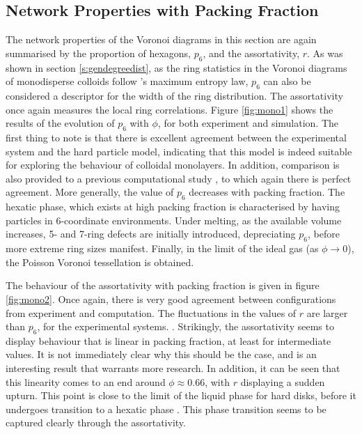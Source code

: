 \subsection{Network Properties with Packing Fraction}

The network properties of the Voronoi diagrams in this section are again summarised by the proportion of hexagons, $p_6$, and the assortativity, $r$.
As was shown in section \ref{s:gendegreedist}, as the ring statistics in the Voronoi diagrams of monodisperse \qtd{} colloids follow \lm's maximum entropy law, $p_6$ can also be considered a descriptor for the width of the ring distribution.
The assortativity once again measures the local ring correlations.
Figure \ref{fig:mono1} shows the results of the evolution of $p_6$ with $\phi$, for both experiment and simulation.
The first thing to note is that there is excellent agreement between the experimental system and the hard particle model, indicating that this model is indeed suitable for exploring the behaviour of colloidal monolayers.
In addition, comparison is also provided to a previous computational study \cite{Kumar2005}, to which again there is perfect agreement.
More generally, the value of $p_6$ decreases with packing fraction.
The hexatic phase, which exists at high packing fraction is characterised by having particles in 6\--coordinate environments.
Under melting, as the available volume increases, 5\-- and 7\--ring defects are initially introduced, depreciating $p_6$, before more extreme ring sizes manifest.
Finally, in the limit of the ideal gas (as $\phi\rightarrow 0$), the Poisson Voronoi tessellation is obtained.

The behaviour of the assortativity with packing fraction is given in figure \ref{fig:mono2}.
Once again, there is very good agreement between configurations from experiment and computation.
The fluctuations in the values of $r$ are larger than $p_6$, for the experimental systems.
.
Strikingly, the assortativity seems to display behaviour that is linear in packing fraction, at least for intermediate values.
It is not immediately clear why this should be the case, and is an interesting result that warrants more research.
In addition, it can be seen that this linearity comes to an end around $\phi\approx 0.66$, with $r$ displaying a sudden upturn.
This point is close to the limit of the liquid phase for hard disks, before it undergoes transition to a hexatic phase \cite{Thorneywork2017}.
This phase transition seems to be captured clearly through the assortativity.

